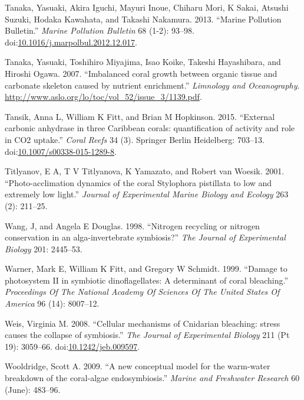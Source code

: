 \documentclass[]{elsarticle} %
\begin{document}
\hypertarget{ref-Tanaka:2013dj}{}
Tanaka, Yasuaki, Akira Iguchi, Mayuri Inoue, Chiharu Mori, K Sakai,
Atsushi Suzuki, Hodaka Kawahata, and Takashi Nakamura. 2013. ``Marine
Pollution Bulletin.'' \emph{Marine Pollution Bulletin} 68 (1-2): 93--98.
doi:\href{https://doi.org/10.1016/j.marpolbul.2012.12.017}{10.1016/j.marpolbul.2012.12.017}.

\hypertarget{ref-Tanaka:2007uv}{}
Tanaka, Yasuaki, Toshihiro Miyajima, Isao Koike, Takeshi Hayashibara,
and Hiroshi Ogawa. 2007. ``Imbalanced coral growth between organic
tissue and carbonate skeleton caused by nutrient enrichment.''
\emph{Limnology and Oceanography}.
\url{http://www.aslo.org/lo/toc/vol_52/issue_3/1139.pdf}.

\hypertarget{ref-Tansik:2015cm}{}
Tansik, Anna L, William K Fitt, and Brian M Hopkinson. 2015. ``External
carbonic anhydrase in three Caribbean corals: quantification of activity
and role in CO2 uptake.'' \emph{Coral Reefs} 34 (3). Springer Berlin
Heidelberg: 703--13.
doi:\href{https://doi.org/10.1007/s00338-015-1289-8}{10.1007/s00338-015-1289-8}.

\hypertarget{ref-Titlyanov:2001p3631}{}
Titlyanov, E A, T V Titlyanova, K Yamazato, and Robert van Woesik. 2001.
``Photo-acclimation dynamics of the coral Stylophora pistillata to low
and extremely low light.'' \emph{Journal of Experimental Marine Biology
and Ecology} 263 (2): 211--25.

\hypertarget{ref-Wang:1998p128}{}
Wang, J, and Angela E Douglas. 1998. ``Nitrogen recycling or nitrogen
conservation in an alga-invertebrate symbiosis?'' \emph{The Journal of
Experimental Biology} 201: 2445--53.

\hypertarget{ref-Warner:1999p4239}{}
Warner, Mark E, William K Fitt, and Gregory W Schmidt. 1999. ``Damage to
photosystem II in symbiotic dinoflagellates: A determinant of coral
bleaching.'' \emph{Proceedings Of The National Academy Of Sciences Of
The United States Of America} 96 (14): 8007--12.

\hypertarget{ref-Weis:2008p944}{}
Weis, Virginia M. 2008. ``Cellular mechanisms of Cnidarian bleaching:
stress causes the collapse of symbiosis.'' \emph{The Journal of
Experimental Biology} 211 (Pt 19): 3059--66.
doi:\href{https://doi.org/10.1242/jeb.009597}{10.1242/jeb.009597}.

\hypertarget{ref-Wooldridge:2009p7807}{}
Wooldridge, Scott A. 2009. ``A new conceptual model for the warm-water
breakdown of the coral-algae endosymbiosis.'' \emph{Marine and
Freshwater Research} 60 (June): 483--96.
\end{document}
